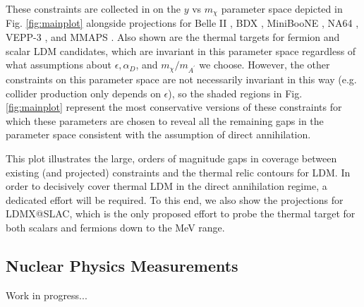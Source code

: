 These constraints are collected in on the $y$ vs $m_\chi$ parameter space depicted in Fig. \ref{fig:mainplot}  alongside projections
for Belle II \cite{Essig:2013vha}, BDX \cite{Izaguirre:2013uxa,Battaglieri:2016ggd}, MiniBooNE \cite{Dharmapalan:2012xp}, NA64 \cite{Gninenko:2016kpg}, VEPP-3 \cite{Wojtsekhowski:2012zq}, and MMAPS \cite{cornell}.
Also shown are the thermal targets for fermion and scalar LDM candidates, which are invariant in this parameter space regardless
of what assumptions about $\epsilon, \alpha_D$, and $m_\chi/m_{A^\prime}$ we choose. However, the other constraints on this 
parameter space are not necessarily invariant in this way (e.g. collider production only depends on $\epsilon$), so the 
shaded regions in Fig. \ref{fig:mainplot} represent the most conservative versions of these constraints for which
 these parameters are chosen to reveal all the remaining gaps in the parameter space consistent with the assumption of 
 direct annihilation. 
 
 This plot illustrates the large, orders of magnitude gaps in coverage between existing (and projected) constraints
 and the thermal relic contours for LDM. In order to decisively cover thermal LDM in the direct annihilation regime, a dedicated effort will
 be required. To this end, we also show the projections for LDMX@SLAC, which is the only proposed effort to probe the thermal
 target for both scalars and fermions down to the MeV range. 

\subsection{Nuclear Physics Measurements}

Work in progress...


